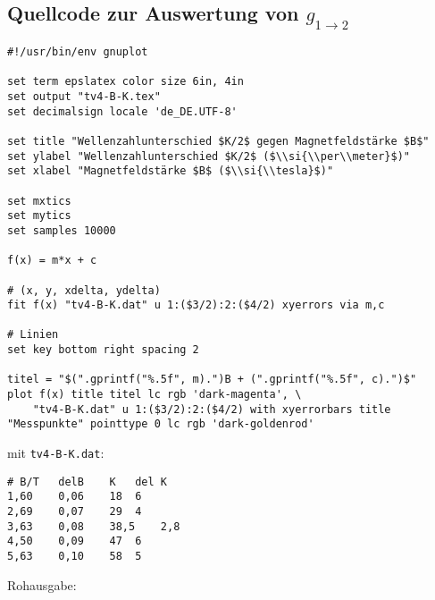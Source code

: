 \subsection{\gnuplot{} Quellcode zur Auswertung von $g_{1\rightarrow2}$}
    \label{appdx:tv4-part2}
    {  
        \renewcommand{\fcolorbox}[4][]{#4}
        \begin{verbatim}
#!/usr/bin/env gnuplot

set term epslatex color size 6in, 4in
set output "tv4-B-K.tex"
set decimalsign locale 'de_DE.UTF-8'

set title "Wellenzahlunterschied $K/2$ gegen Magnetfeldstärke $B$"
set ylabel "Wellenzahlunterschied $K/2$ ($\\si{\\per\\meter}$)"
set xlabel "Magnetfeldstärke $B$ ($\\si{\\tesla}$)"

set mxtics
set mytics
set samples 10000

f(x) = m*x + c

# (x, y, xdelta, ydelta)
fit f(x) "tv4-B-K.dat" u 1:($3/2):2:($4/2) xyerrors via m,c

# Linien
set key bottom right spacing 2

titel = "$(".gprintf("%.5f", m).")B + (".gprintf("%.5f", c).")$"
plot f(x) title titel lc rgb 'dark-magenta', \
    "tv4-B-K.dat" u 1:($3/2):2:($4/2) with xyerrorbars title "Messpunkte" pointtype 0 lc rgb 'dark-goldenrod'
        \end{verbatim}
    }
    mit \texttt{tv4-B-K.dat}:
    \begin{multicols}{2}
        \begin{verbatim}
# B/T   delB    K   del K
1,60    0,06    18  6
2,69    0,07    29  4
3,63    0,08    38,5    2,8
4,50    0,09    47  6
5,63    0,10    58  5
        \end{verbatim}
    \end{multicols}
    \vspace{-\baselineskip}
    Rohausgabe:
